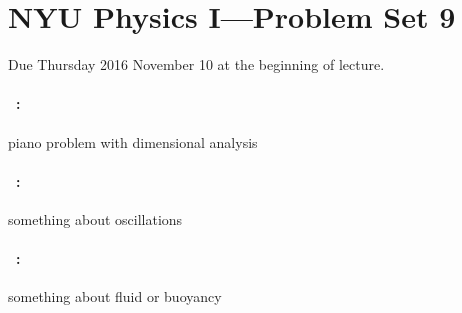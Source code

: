 \documentclass[12pt]{article}
\begin{document}
\section*{NYU Physics I---Problem Set 9}

Due Thursday 2016 November 10 at the beginning of lecture.

\paragraph{\problemname~\theproblem:}%
piano problem with dimensional analysis

\paragraph{\problemname~\theproblem:}%
something about oscillations

\paragraph{\problemname~\theproblem:}%
something about fluid or buoyancy
\end{document}
